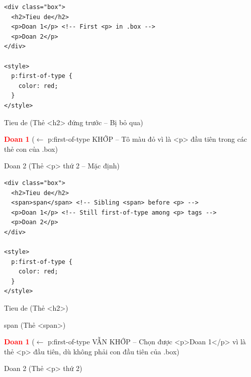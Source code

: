 \documentclass[11pt,oneside]{book}
\begin{document}
\begin{codeWindow}
\begin{lstlisting}[language=HTML5]
<div class="box">
  <h2>Tieu de</h2>
  <p>Doan 1</p> <!-- First <p> in .box -->
  <p>Doan 2</p>
</div>

<style>
  p:first-of-type {
    color: red;
  }
</style>
\end{lstlisting}
\end{codeWindow}

\begin{browserWindow}
\sffamily\small
Tieu de {\scriptsize\textcolor{gray!60}{(Thẻ <h2> đứng trước -- Bị bỏ qua)}} \par\vspace{2pt}
\textcolor{red}{\textbf{Doan 1}} {\scriptsize\textcolor{gray!60}{($\leftarrow$ p:first-of-type KHỚP -- Tô màu đỏ vì là <p> đầu tiên trong các thẻ con của .box)}} \par\vspace{2pt}
Doan 2 {\scriptsize\textcolor{gray!60}{(Thẻ <p> thứ 2 -- Mặc định)}}
\end{browserWindow}

\begin{codeWindow}
\begin{lstlisting}[language=HTML5]
<div class="box">
  <h2>Tieu de</h2>
  <span>span</span> <!-- Sibling <span> before <p> -->
  <p>Doan 1</p> <!-- Still first-of-type among <p> tags -->
  <p>Doan 2</p>
</div>

<style>
  p:first-of-type {
    color: red;
  }
</style>
\end{lstlisting}
\end{codeWindow}

\begin{browserWindow}
\sffamily\small
Tieu de {\scriptsize\textcolor{gray!60}{(Thẻ <h2>)}} \par\vspace{2pt}
span {\scriptsize\textcolor{gray!60}{(Thẻ <span>)}} \par\vspace{2pt}
\textcolor{red}{\textbf{Doan 1}} {\scriptsize\textcolor{gray!60}{($\leftarrow$ p:first-of-type VẪN KHỚP -- Chọn được <p>Doan 1</p> vì là thẻ <p> đầu tiên, dù không phải con đầu tiên của .box)}} \par\vspace{2pt}
Doan 2 {\scriptsize\textcolor{gray!60}{(Thẻ <p> thứ 2)}}
\end{browserWindow}
\end{document}
